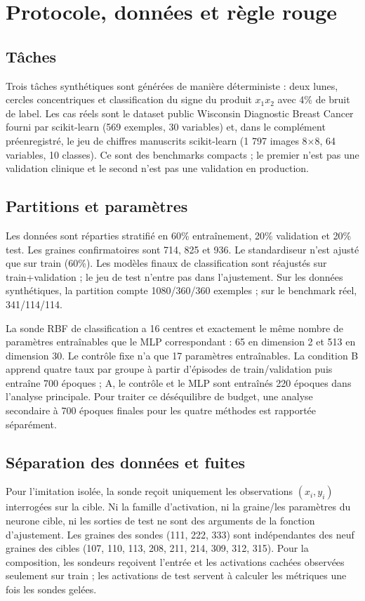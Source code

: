 \documentclass[11pt,a4paper]{article}
\begin{document}
\section{Protocole, données et règle rouge}
\subsection{Tâches}
Trois tâches synthétiques sont générées de manière déterministe : deux lunes, cercles concentriques et classification du signe du produit $x_1x_2$ avec 4\% de bruit de label. Les cas réels sont le dataset public Wisconsin Diagnostic Breast Cancer fourni par scikit-learn (569 exemples, 30 variables) et, dans le complément préenregistré, le jeu de chiffres manuscrits scikit-learn (1 797 images 8×8, 64 variables, 10 classes). Ce sont des benchmarks compacts ; le premier n'est pas une validation clinique et le second n'est pas une validation en production.

\subsection{Partitions et paramètres}
Les données sont réparties stratifié en 60\% entraînement, 20\% validation et 20\% test. Les graines confirmatoires sont 714, 825 et 936. Le standardiseur n'est ajusté que sur train (60\%). Les modèles finaux de classification sont réajustés sur train+validation ; le jeu de test n'entre pas dans l'ajustement. Sur les données synthétiques, la partition compte 1080/360/360 exemples ; sur le benchmark réel, 341/114/114.

La sonde RBF de classification a 16 centres et exactement le même nombre de paramètres entraînables que le MLP correspondant : 65 en dimension 2 et 513 en dimension 30. Le contrôle fixe n'a que 17 paramètres entraînables. La condition B apprend quatre taux par groupe à partir d'épisodes de train/validation puis entraîne 700 époques ; A, le contrôle et le MLP sont entraînés 220 époques dans l'analyse principale. Pour traiter ce déséquilibre de budget, une analyse secondaire à 700 époques finales pour les quatre méthodes est rapportée séparément.

\subsection{Séparation des données et fuites}
Pour l'imitation isolée, la sonde reçoit uniquement les observations $(x_i,y_i)$ interrogées sur la cible. Ni la famille d'activation, ni la graine/les paramètres du neurone cible, ni les sorties de test ne sont des arguments de la fonction d'ajustement. Les graines des sondes (111, 222, 333) sont indépendantes des neuf graines des cibles (107, 110, 113, 208, 211, 214, 309, 312, 315). Pour la composition, les sondeurs reçoivent l'entrée et les activations cachées observées seulement sur train ; les activations de test servent à calculer les métriques une fois les sondes gelées.
\end{document}
